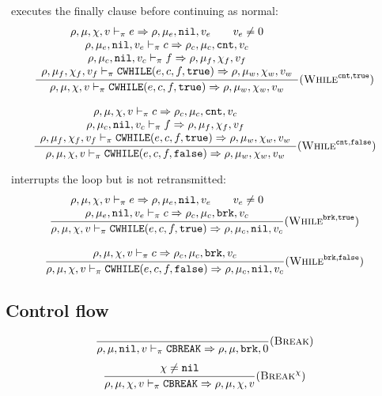 \cnt\ executes the finally clause before continuing as normal:
\[\dfrac{\begin{array}{c}
    \rho,\mu,\chi,v \vdash_\pi e \Rightarrow \rho,\mu_e,\texttt{nil},v_e \qquad v_e \ne 0 \\
    \rho,\mu_e,\texttt{nil},v_e \vdash_\pi c \Rightarrow \rho_c,\mu_c,\texttt{cnt},v_c \\
    \rho,\mu_c,\texttt{nil},v_c \vdash_\pi f \Rightarrow \rho,\mu_f,\chi_f,v_f \\
    \rho,\mu_f,\chi_f,v_f \vdash_\pi \texttt{CWHILE}(e, c, f, \texttt{true}) \Rightarrow \rho,\mu_w,\chi_w,v_w
\end{array}}{\rho,\mu,\chi,v \vdash_\pi \texttt{CWHILE}(e, c, f, \texttt{true}) \Rightarrow \rho,\mu_w,\chi_w,v_w} (\textsc{While}^{\texttt{cnt},\texttt{true}})\]

\[\dfrac{\begin{array}{c}
    \rho,\mu,\chi,v \vdash_\pi c \Rightarrow \rho_c,\mu_c,\texttt{cnt},v_c \\
    \rho,\mu_c,\texttt{nil},v_c \vdash_\pi f \Rightarrow \rho,\mu_f,\chi_f,v_f \\
    \rho,\mu_f,\chi_f,v_f \vdash_\pi \texttt{CWHILE}(e, c, f, \texttt{true}) \Rightarrow \rho,\mu_w,\chi_w,v_w
\end{array}}{\rho,\mu,\chi,v \vdash_\pi \texttt{CWHILE}(e, c, f, \texttt{false}) \Rightarrow \rho,\mu_w,\chi_w,v_w} (\textsc{While}^{\texttt{cnt},\texttt{false}})\]

\brk\ interrupts the loop but is not retransmitted:
\[\dfrac{\begin{array}{c}
    \rho,\mu,\chi,v \vdash_\pi e \Rightarrow \rho,\mu_e,\texttt{nil},v_e \qquad v_e \ne 0 \\
    \rho,\mu_e,\texttt{nil},v_e \vdash_\pi c \Rightarrow \rho_c,\mu_c,\texttt{brk},v_c \\
\end{array}}{\rho,\mu,\chi,v \vdash_\pi \texttt{CWHILE}(e, c, f, \texttt{true}) \Rightarrow \rho,\mu_c,\texttt{nil},v_c} (\textsc{While}^{\texttt{brk},\texttt{true}})\]

\[\dfrac{\begin{array}{c}
    \rho,\mu,\chi,v \vdash_\pi c \Rightarrow \rho_c,\mu_c,\texttt{brk},v_c \\
\end{array}}{\rho,\mu,\chi,v \vdash_\pi \texttt{CWHILE}(e, c, f, \texttt{false}) \Rightarrow \rho,\mu_c,\texttt{nil},v_c} (\textsc{While}^{\texttt{brk},\texttt{false}})\]

\subsection{Control flow}
\[\dfrac{
}{\rho,\mu,\texttt{nil},v \vdash_\pi \texttt{CBREAK} \Rightarrow \rho,\mu,\texttt{brk},0} (\textsc{Break})\]
\[\dfrac{\begin{array}{c}
    \chi\ne\texttt{nil}
\end{array}}{\rho,\mu,\chi,v \vdash_\pi \texttt{CBREAK} \Rightarrow \rho,\mu,\chi,v} (\textsc{Break}^\chi)\]

